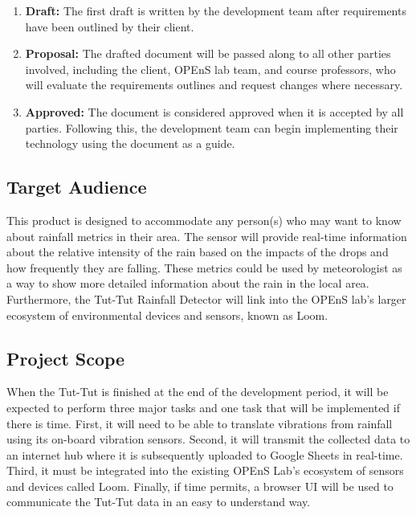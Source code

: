 \documentclass[letterpaper,10pt,draftclsnofoot,onecolumn]{article}
\begin{document}
\begin{enumerate}
    \item \textbf{Draft:}  The first draft is written by the development team after requirements have been outlined by their client. 
    \item \textbf{Proposal:} The drafted document will be passed along to all other parties involved, including the client, OPEnS lab team, and course professors, who will evaluate the requirements outlines and request changes where necessary.
    \item \textbf{Approved:} The document is considered approved when it is accepted by all parties. Following this, the development team can begin implementing their technology using the document as a guide.
\end{enumerate}

\subsection{Target Audience}
This product is designed to accommodate any person(s) who may want to know about rainfall metrics in their area. The sensor will provide real-time information about the relative intensity of the rain based on the impacts of the drops and how frequently they are falling. These metrics could be used by meteorologist as a way to show more detailed information about the rain in the local area. Furthermore, the Tut-Tut Rainfall Detector will link into the OPEnS lab's larger ecosystem of environmental devices and sensors, known as Loom.

\subsection{Project Scope}
When the Tut-Tut is finished at the end of the development period, it will be expected to perform three major tasks and one task that will be implemented if there is time. First, it will need to be able to translate vibrations from rainfall using its on-board vibration sensors. Second, it will transmit the collected data to an internet hub where it is subsequently uploaded to Google Sheets in real-time. Third, it must be integrated into the existing OPEnS Lab's ecosystem of sensors and devices called Loom. Finally, if time permits, a browser UI will be used to communicate the Tut-Tut data in an easy to understand way.
\end{document}
